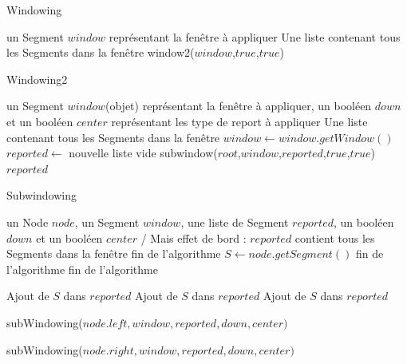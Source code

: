 \documentclass[10pt,a4paper]{article}
\begin{document}
\begin{algorithm}
\caption{Windowing}
\begin{algorithmic}[1]
\REQUIRE un Segment $window$ représentant la fenêtre à appliquer
\ENSURE Une liste contenant tous les Segments dans la fenêtre
\RETURN window2($window$,$true$,$true$)
\end{algorithmic}
\end{algorithm}

\begin{algorithm}
\caption{Windowing2}
\begin{algorithmic}[1]
\REQUIRE un Segment $window$(objet) représentant la fenêtre à appliquer, un booléen $down$ et un booléen $center$ représentant les type de report à appliquer
\ENSURE Une liste contenant tous les Segments dans la fenêtre
\STATE $window \leftarrow window.getWindow()$
\STATE $reported \leftarrow$ nouvelle liste vide
\STATE subwindow($root$,$window$,$reported$,$true$,$true$)
\RETURN $reported$
\end{algorithmic}
\end{algorithm}

\newpage

\begin{algorithm}
\caption{Subwindowing}
\begin{algorithmic}[1]
\REQUIRE un Node $node$, un Segment $window$, une liste de Segment $reported$, un booléen $down$ et un booléen $center$
\ENSURE / Mais effet de bord : $reported$ contient tous les Segments dans la fenêtre
\STATE fin de l'algorithme
\ENDIF
\STATE $S \leftarrow node.getSegment()$
\STATE fin de l'algorithme
\ENDIF
{}
\STATE fin de l'algorithme
\ENDIF


\STATE Ajout de $S$ dans $reported$
\ENDIF
{}
\STATE Ajout de $S$ dans $reported$
\ENDIF
{}
\STATE Ajout de $S$ dans $reported$
\ENDIF

\STATE subWindowing($node.left,window,reported,down,center)$
\ENDIF

\STATE subWindowing($node.right,window,reported,down,center)$
\ENDIF

\end{algorithmic}
\end{algorithm}
\end{document}
